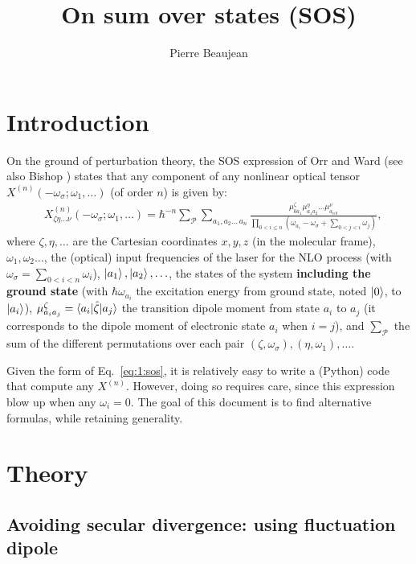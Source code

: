 \documentclass[12pt,a4paper]{article}
\title{On sum over states (SOS)}
\author{Pierre Beaujean}
\begin{document}
\maketitle

\allowdisplaybreaks
\onehalfspacing

\section{Introduction}

On the ground of perturbation theory, 
the SOS expression of Orr and Ward \cite{orrPerturbationTheoryNonlinear1971} (see also Bishop \cite{bishopExplicitNondivergentFormulas1994}) states that any component of any nonlinear optical tensor $X^{(n)}(-\omega_\sigma;\omega_1,\ldots)$ (of order $n$) is given by:\begin{align}
&X^{(n)}_{\zeta\eta\ldots\nu}(-\omega_\sigma;\omega_1,\ldots) = \hbar^{-n}\sum_\mathcal{P}\sum_{a_1,a_2\ldots\,a_{n}} \frac{\mu^\zeta_{0a_1}{\mu}^\eta_{a_1a_2}\ldots \mu^\nu_{a_{n\,0}}}{\prod_{0<i\leq n} (\omega_{a_i}-\omega_\sigma+\sum_{0<j<i} \omega_j)},\label{eq:1:sos}
\end{align}
where $\zeta,\eta,\ldots$ are the Cartesian coordinates $x, y, z$ (in the molecular frame), $\omega_1, \omega_2\ldots$, the (optical) input frequencies of the laser for the NLO process (with $\omega_\sigma = \sum_{0<i<n} \omega_i$), $\ket{a_1}, \ket{a_2}, \ldots$, the states of the system  \textbf{including the ground state} (with $\hbar\omega_{a_i}$ the excitation energy from ground state, noted  $\ket{0}$, to $\ket{a_i}$), $\mu^\zeta_{a_ia_j} = \braket{a_i|\hat \zeta|a_j}$ the transition dipole moment from state $a_i$ to $a_j$ (it corresponds to the dipole moment of electronic state $a_i$ when $i=j$), and $\sum_\mathcal{P}$ the sum of the different permutations over each pair $(\zeta, \omega_\sigma),(\eta,\omega_1),\ldots$. 

Given the form of Eq.~\eqref{eq:1:sos}, it is relatively easy to write a (Python) code that compute any $X^{(n)}$. However, doing so requires care, since this expression blow up when any $\omega_i = 0$. The goal of this document is to find alternative formulas, while retaining generality.

\section{Theory}

\subsection{Avoiding secular divergence: using fluctuation dipole}
\end{document}
